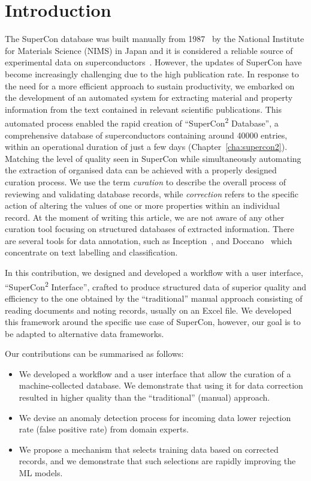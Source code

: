 \section{Introduction}

The SuperCon database was built manually from 1987~\cite{ishii2023structuring} by the National Institute for Materials Science (NIMS) in Japan and it is considered a reliable source of experimental data on superconductors~\cite{roter2020predicting, stanev2017machine, tran2022machine, konno2021deep}. 
However, the updates of SuperCon have become increasingly challenging due to the high publication rate. 
In response to the need for a more efficient approach to sustain productivity, we embarked on the development of an automated system for extracting material and property information from the text contained in relevant scientific publications. 
This automated process enabled the rapid creation of ``SuperCon\textsuperscript{2} Database'', a comprehensive database of superconductors containing around 40000 entries, within an operational duration of just a few days (Chapter~\ref{cha:supercon2}). 
Matching the level of quality seen in SuperCon while simultaneously automating the extraction of organised data can be achieved with a properly designed curation process. 
We use the term \emph{curation} to describe the overall process of reviewing and validating database records, while \emph{correction} refers to the specific action of altering the values of one or more properties within an individual record.
At the moment of writing this article, we are not aware of any other curation tool focusing on structured databases of extracted information. 
There are several tools for data annotation, such as Inception~\cite{klie-etal-2018-inception}, and Doccano~\cite{doccano} which concentrate on text labelling and classification.

In this contribution, we designed and developed a workflow with a user interface, ``SuperCon\textsuperscript{2} Interface'', crafted to produce structured data of superior quality and efficiency to the one obtained by the ``traditional'' manual approach consisting of reading documents and noting records, usually on an Excel file.
We developed this framework around the specific use case of SuperCon, however, our goal is to be adapted to alternative data frameworks.

Our contributions can be summarised as follows:
\begin{itemize}
    \item We developed a workflow and a user interface that allow the curation of a machine-collected database. We demonstrate that using it for data correction resulted in higher quality than the ``traditional'' (manual) approach.
    \item We devise an anomaly detection process for incoming data lower rejection rate (false positive rate) from domain experts.
    \item We propose a mechanism that selects training data based on corrected records, and we demonstrate that such selections are rapidly improving the ML models.
\end{itemize}

